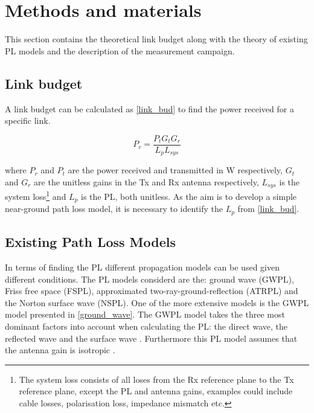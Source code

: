 \section{Methods and materials}
This section contains the theoretical link budget along with the theory of existing PL models and the description of the measurement campaign.

\subsection{Link budget}
A link budget can be calculated as \eqref{link_bud} to find the power received for a specific link.

\begin{equation}
P_{r} = \frac{P_{t}G_{t}G_{r}}{L_{p}L_{sys}}
\label{link_bud}
\end{equation}

where $P_{r}$ and $P_{t}$ are the power received and transmitted in W respectively, $G_t$ and $G_r$ are the unitless gains in the Tx and Rx antenna respectively, $L_{sys}$ is the system loss\footnote{The system loss consists of all loses from the Rx reference plane to the Tx reference plane, except the PL and antenna gains, examples could include cable losses, polarisation loss, impedance mismatch etc.} and $L_{p}$ is the PL, both unitless. As the aim is to develop a simple near-ground path loss model, it is necessary to identify the $L_{p}$ from \eqref{link_bud}.


\subsection{Existing Path Loss Models}

In terms of finding the PL different propagation models can be used given different conditions. The PL models considerd are the: ground wave (GWPL), Friss free space (FSPL), approximated two-ray-ground-reflection (ATRPL) and the Norton surface wave (NSPL). One of the more extensive models is the GWPL model presented in \eqref{ground_wave}. The GWPL model takes the three most dominant factors into account when calculating the PL: the direct wave, the reflected wave and the surface wave \cite{Chong,Bullington}. Furthermore this PL model assumes that the antenna gain is isotropic \cite{Bullington}.  


